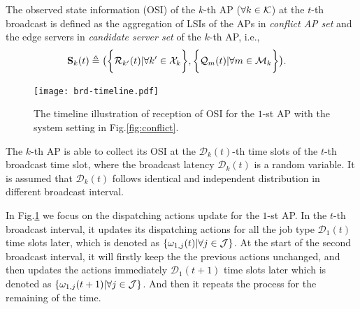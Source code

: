 \begin{definition}
    The observed state information (OSI) of the $k$-th AP ($\forall k\in\mathcal{K}$) at the $t$-th broadcast is defined as the aggregation of LSIs of the APs in \emph{conflict AP set} and the edge servers in \emph{candidate server set} of the $k$-th AP, i.e.,
    \begin{align}
        \mathbf{S}_{k}(t) &\triangleq
        \big(
            \bigg\{\mathcal{R}_{k'}(t) | \forall k'\in\mathcal{X}_{k}\bigg\},
            \bigg\{\mathcal{Q}_{m}(t) | \forall m\in\mathcal{M}_{k}\bigg\}
        \big).
    \end{align}
    \label{def:OSI}
\end{definition}

\begin{figure}[t]
    \centering
    \texttt{[image: brd-timeline.pdf]}
    \caption{The timeline illustration of reception of OSI for the $1$-st AP with the system setting in Fig.\ref{fig:conflict}.}
    \label{fig:brd-timeline}
\end{figure}

The $k$-th AP is able to collect its OSI at the $\mathcal{D}_{k}(t)$-th time slots of the $t$-th broadcast time slot, where the broadcast latency $\mathcal{D}_{k}(t)$ is a random variable.
It is assumed that $\mathcal{D}_{k}(t)$ follows identical and independent distribution in different broadcast interval.

\begin{example}
    In Fig.\ref{fig:brd-timeline} we focus on the dispatching actions update for the $1$-st AP.
    In the $t$-th broadcast interval, it updates its dispatching actions for all the job type $\mathcal{D}_{1}(t)$ time slots later, which is denoted as $\{\omega_{1,j}(t) | \forall j\in\mathcal{J}\}$.
    At the start of the second broadcast interval, it will firstly keep the the previous actions unchanged, and then updates the actions immediately $\mathcal{D}_{1}(t+1)$ time slots later which is denoted as $\{\omega_{1,j}(t+1) | \forall j\in\mathcal{J}\}$.
    And then it repeats the process for the remaining of the time.
\end{example}
